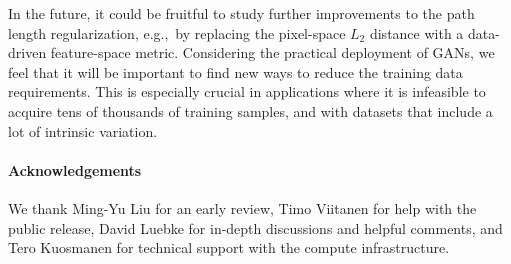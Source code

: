 \documentclass[10pt,twocolumn,letterpaper]{article}
\newif\ifarxiv
\newcommand{\FINAL}[2][]{#2} %
\begin{document}
In \FINAL{the} future, it could be fruitful to study further improvements to the path length regularization, e.g.,~by replacing the pixel-space $L_2$ distance with a data-driven feature-space metric.
\FINAL{Considering the practical deployment of GANs, we feel that it will be important to find new ways to reduce the training data requirements. This is especially crucial in applications where it is infeasible to acquire tens of thousands of training samples, and with datasets that include a lot of intrinsic variation.}

\vspace{-2mm}
\paragraph*{\FINAL{Acknowledgements}}
\FINAL{
We thank Ming-Yu Liu for an early review, Timo Viitanen for help with the public release, David Luebke for in-depth discussions and helpful comments, and Tero Kuosmanen for technical support with the compute infrastructure. 
}

{\small


}

\ifarxiv
\clearpage
\appendix

\fi
\end{document}
